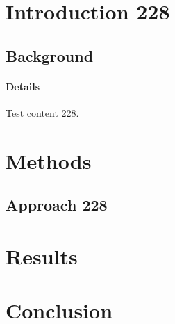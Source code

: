 \documentclass{article}
\begin{document}
\section{Introduction 228}
\subsection{Background}
\paragraph{Details} Test content 228.
\section{Methods}
\subsection{Approach 228}
\section{Results}
\section{Conclusion}
\end{document}
